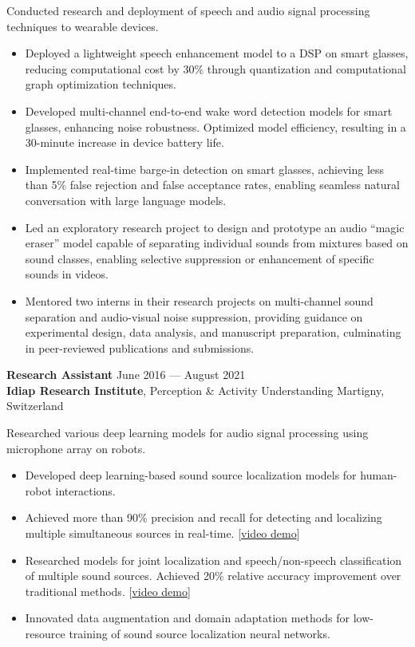 \documentclass[a4paper,9pt]{extarticle} %
\begin{document}
Conducted research and deployment of speech and audio signal processing techniques to wearable devices.
\vspace{-.9\parskip}
\begin{itemize}[nosep]
  \item Deployed a lightweight speech enhancement model to a DSP on smart glasses, reducing computational cost by 30\% through quantization and computational graph optimization techniques.
  \item Developed multi-channel end-to-end wake word detection models for smart glasses, enhancing noise robustness. Optimized model efficiency, resulting in a 30-minute increase in device battery life.
  \item Implemented real-time barge-in detection on smart glasses, achieving less than 5\% false rejection and false acceptance rates, enabling seamless natural conversation with large language models.
  \item Led an exploratory research project to design and prototype an audio ``magic eraser'' model capable of separating individual sounds from mixtures based on sound classes, enabling selective suppression or enhancement of specific sounds in videos.
  \item Mentored two interns in their research projects on multi-channel sound separation and audio-visual noise suppression, providing guidance on experimental design, data analysis, and manuscript preparation, culminating in peer-reviewed publications and submissions.
\end{itemize}

\textbf{Research Assistant} \hfill June 2016 --- August 2021 \\
\textbf{Idiap Research Institute}, Perception \& Activity Understanding  \hfill Martigny, Switzerland \\
\vspace{-1.5\parskip}

Researched various deep learning models for audio signal processing using microphone array on robots.
\vspace{-.9\parskip}
\begin{itemize}[nosep]
  \item Developed deep learning-based sound source localization models for human-robot interactions.
  \item Achieved more than 90\% precision and recall for detecting and localizing multiple simultaneous sources in real-time. [\href{https://www.youtube.com/watch?v=_4EwuVlE_pU}{video demo}]
  \item Researched models for joint localization and speech/non-speech classification of multiple sound sources. Achieved 20\% relative accuracy improvement over traditional methods. [\href{https://www.youtube.com/watch?v=O7bQvg03RTc}{video demo}]
  \item Innovated data augmentation and domain adaptation methods for low-resource training of sound source localization neural networks.
\end{itemize}
\end{document}
